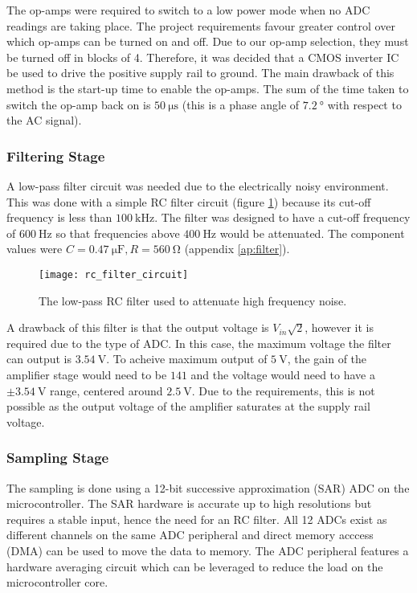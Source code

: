 The op-amps were required to switch to a low power mode when no ADC readings are taking place.
The project requirements favour greater control over which op-amps can be turned on and off.
Due to our op-amp selection, they must be turned off in blocks of 4.
Therefore, it was decided that a CMOS inverter IC be used to drive the positive supply rail to ground.
The main drawback of this method is the start-up time to enable the op-amps.
The sum of the time taken to switch the op-amp back on is $\SI{50}{\micro\second}$ (this is a phase angle of $\SI{7.2}{\degree}$ with respect to the AC signal).

\subsubsection{Filtering Stage}

A low-pass filter circuit was needed due to the electrically noisy environment.
This was done with a simple RC filter circuit (figure \ref{fig:filter}) because its cut-off frequency is less than $\SI{100}{\kilo\hertz}$.
The filter was designed to have a cut-off frequency of $\SI{600}{\hertz}$ so that frequencies above $\SI{400}{\hertz}$ would be attenuated.
The component values were $C = \SI{0.47}{\micro\farad}, R = \SI{560}{\ohm}$ (appendix \ref{ap:filter}).
\begin{figure}[H]
	\centering
	\texttt{[image: rc\_filter\_circuit]}
	\caption{The low-pass RC filter used to attenuate high frequency noise.}
	\label{fig:filter}
\end{figure}

A drawback of this filter is that the output voltage is $V_{in} \sqrt{2}$, however it is required due to the type of ADC.
In this case, the maximum voltage the filter can output is $\SI{3.54}{\volt}$.
To acheive maximum output of $\SI{5}{\volt}$, the gain of the amplifier stage would need to be $141$ and the voltage would need to have a $\pm\SI{3.54}{\volt}$ range, centered around $\SI{2.5}{\volt}$.
Due to the requirements, this is not possible as the output voltage of the amplifier saturates at the supply rail voltage.

\subsubsection{Sampling Stage}

The sampling is done using a 12-bit successive approximation (SAR) ADC on the microcontroller.
The SAR hardware is accurate up to high resolutions but requires a stable input, hence the need for an RC filter.
All 12 ADCs exist as different channels on the same ADC peripheral and direct memory acccess (DMA) can be used to move the data to memory.
The ADC peripheral features a hardware averaging circuit which can be leveraged to reduce the load on the microcontroller core.


